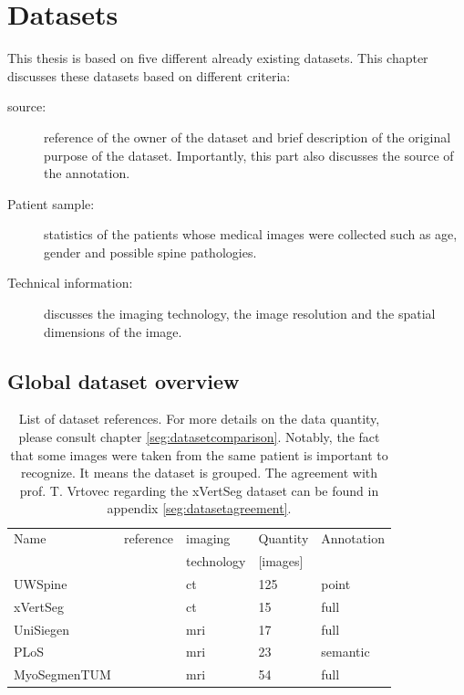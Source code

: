 \chapter{Datasets\label{sec:datasets}}

This thesis is based on five different already existing datasets.
This chapter discusses these datasets based on different criteria:

\begin{description}
    \item[source:] reference of the owner of the dataset and brief description of the original purpose of the dataset. Importantly, this part also discusses the source of the annotation.
    \item[Patient sample:] statistics of the patients whose medical images were collected such as age, gender and possible spine pathologies.
    \item[Technical information:] discusses the imaging technology, the image resolution and the spatial dimensions of the image. 
\end{description}

\section{Global dataset overview}


\begin{table}
 
    \begin{tabular}{ l l l l l} 
     \hline
     \hline
     Name & reference & imaging & Quantity & Annotation \\
          &           & technology & [images] & \\
     \hline 
    UWSpine & \cite{Glocker}  & \acrshort{ct} & 125 & point  \\ 
    xVertSeg & \cite{Ibragimov2014, Korez2015} & \acrshort{ct} & 15 & full \\
    UniSiegen  & \cite{Zukic2014} & \acrshort{mri} & 17 & full \\
    PLoS & \cite{Chu2015} & \acrshort{mri} & 23 & semantic \\
    MyoSegmenTUM & \cite{Burian2019} & \acrshort{mri} &  54 & full \\
     \hline
     \hline
    \end{tabular}
    \caption{List of dataset references. For more details on the data quantity, please consult chapter \ref{seg:datasetcomparison}. 
    Notably, the fact that some images were taken from the same patient is important to recognize. It means the dataset is grouped. 
    The agreement with prof. T. Vrtovec regarding the xVertSeg dataset can be found in appendix \ref{seg:datasetagreement}.}

\end{table}


